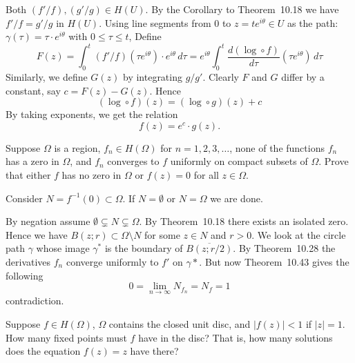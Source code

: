 \begin{enumerate}
Both \((f'/f), (g'/g)\in H(U)\).
By the Corollary to Theorem~10.18 we have \(f'/f = g'/g\) in \(H(U)\).
Using line segments from $0$ to \(z=te^{i\theta}\in U\) 
as the path: \(\gamma(\tau) = \tau\cdot e^{i\theta}\) with \(0\leq \tau\leq t\), 
Define
\begin{equation*}
F(z) 
= \int_0^t (f'/f)(\tau e^{i\theta})\cdot e^{i\theta}\,d\tau
= e^{i\theta} \int_0^t \frac{d(\log\circ f)}{d\tau}(\tau e^{i\theta})\,d\tau
\end{equation*}
Similarly, we define \(G(z)\) by integrating \(g/g'\).
Clearly $F$ and $G$ differ by a constant, say \(c=F(z)-G(z)\). Hence
\begin{equation*}
(\log\circ f)(z) = (\log\circ g)(z) + c
\end{equation*}
By taking exponents, we get the relation
\begin{equation*}
f(z) = e^c \cdot g(z).
\end{equation*}

\begin{excopy}
Suppose \(\Omega\) is a region,
\(f_n\in H(\Omega)\) for \(n=1,2,3,\ldots\),
none of the functions \(f_n\) has a zero in \(\Omega\),
and \(f_n\) converges to $f$ uniformly on compact subsets of \(\Omega\).
Prove that either $f$ has no zero in \(\Omega\) or \(f(z)=0\)
for all \(z\in\Omega\).
\end{excopy}

Consider \(N = f^{-1}(0) \subset\Omega\).
If \(N=\emptyset\) or \(N = \Omega\) we are done.

By negation assume \(\emptyset \subsetneq N \subsetneq \Omega\).
By Theorem~10.18 there exists an isolated zero.
Hence we have 
\(B(z;r) \subset \Omega\setminus N\) for some \(z\in N\) and \(r>0\).
We look at the circle path \(\gamma\) whose image \(\gamma^*\) 
is the boundary of \(\overline{B(z;r/2)}\). 
By Theorem~10.28 the derivatives 
\({f_n}\) converge uniformly to \(f'\) on \(\gamma*\).
But now Theorem~10.43 gives the following
\begin{equation*}
0 = \lim_{n\to\infty} N_{f_n} = N_f = 1
\end{equation*}
contradiction.


\begin{excopy}
Suppose \(f\in H(\Omega)\), \(\Omega\) contains the closed unit disc, and
\(|f(z)| < 1\) if \(|z|=1\).
How many fixed points must $f$ have in the disc?
That is, how many solutions does the equation \(f(z)=z\) have there?
\end{excopy}


\end{enumerate}
